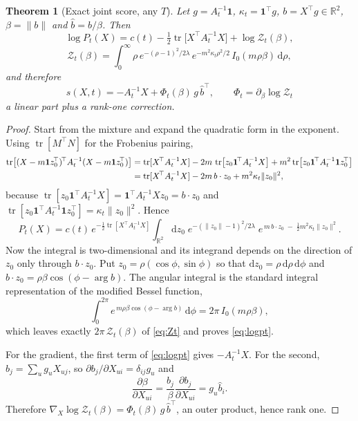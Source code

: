 \documentclass[11pt]{article}
\theoremstyle{plain}
\newtheorem{theorem}{Theorem}
\theoremstyle{remark}
\newcommand{\R}{\mathbb{R}}
\newcommand{\Z}{\mathcal{Z}}
\newcommand{\dd}{\mathrm{d}}
\newcommand{\T}{^{\!\top}}
\newcommand{\one}{\mathbf{1}}
\newcommand{\score}{s}
\DeclareMathOperator{\tr}{tr}
\begin{document}
\begin{theorem}[Exact joint score, any $T$]\label{thm:score}
Let $g = A_t^{-1}\one$, $\kappa_t = \one\T g$, $b = X\T g \in \R^2$,
$\beta = \|b\|$ and $\hat b = b/\beta$. Then
\begin{equation}
  \log P_t(X) = c(t) - \tfrac12 \tr\bigl[X\T A_t^{-1} X\bigr]
  + \log \Z_t(\beta),
  \label{eq:logpt}
\end{equation}
\begin{equation}
  \Z_t(\beta) = \int_0^\infty \rho\, e^{-(\rho-1)^2/2\lambda}\,
  e^{-m^2\kappa_t \rho^2/2}\, I_0(m\rho\beta)\, \dd\rho,
  \label{eq:Zt}
\end{equation}
and therefore
\begin{equation}
  \boxed{\ \score(X,t) = -A_t^{-1} X + \Phi_t(\beta)\, g\, \hat b\T,
  \qquad \Phi_t = \partial_\beta \log \Z_t\ }
  \label{eq:mainscore}
\end{equation}
a linear part plus a \emph{rank-one} correction.
\end{theorem}

\begin{proof}
Start from the mixture and expand the quadratic form in the exponent. Using
$\tr[M\T N]$ for the Frobenius pairing,
\begin{align}
  \tr\bigl[(X - m\one z_0\T)\T A_t^{-1}(X - m\one z_0\T)\bigr]
  &= \tr[X\T A_t^{-1} X]
   - 2m\, \tr\bigl[z_0 \one\T A_t^{-1} X\bigr]
   + m^2 \tr\bigl[z_0 \one\T A_t^{-1}\one z_0\T\bigr] \notag\\
  &= \tr[X\T A_t^{-1} X] - 2m\, b \cdot z_0 + m^2 \kappa_t \|z_0\|^2,
  \label{eq:expand}
\end{align}
because $\tr[z_0\one\T A_t^{-1}X] = \one\T A_t^{-1} X z_0 = b\cdot z_0$ and
$\tr[z_0 \one\T A_t^{-1}\one z_0\T] = \kappa_t \|z_0\|^2$. Hence
\begin{equation}
  P_t(X) = c(t)\, e^{-\frac12 \tr[X\T A_t^{-1}X]}
  \int_{\R^2} \dd z_0\; e^{-(\|z_0\|-1)^2/2\lambda}\;
  e^{\,m\, b\cdot z_0 \;-\; \frac12 m^2 \kappa_t \|z_0\|^2}.
  \label{eq:mixint}
\end{equation}
Now the integral is two-dimensional and its integrand depends on the direction
of $z_0$ only through $b\cdot z_0$. Put $z_0 = \rho(\cos\phi, \sin\phi)$ so that
$\dd z_0 = \rho\,\dd\rho\,\dd\phi$ and
$b \cdot z_0 = \rho\beta\cos(\phi - \arg b)$. The angular integral is the
standard integral representation of the modified Bessel function,
\begin{equation}
  \int_0^{2\pi} e^{\,m\rho\beta\cos(\phi - \arg b)}\, \dd\phi
  = 2\pi\, I_0(m\rho\beta),
\end{equation}
which leaves exactly $2\pi\,\Z_t(\beta)$ of \eqref{eq:Zt} and proves
\eqref{eq:logpt}.

For the gradient, the first term of \eqref{eq:logpt} gives $-A_t^{-1}X$. For the
second, $b_j = \sum_u g_u X_{uj}$, so $\partial b_j/\partial X_{ui} =
\delta_{ij} g_u$ and
\begin{equation}
  \frac{\partial \beta}{\partial X_{ui}}
  = \frac{b_j}{\beta}\frac{\partial b_j}{\partial X_{ui}} = g_u \hat b_i .
\end{equation}
Therefore $\nabla_X \log\Z_t(\beta) = \Phi_t(\beta)\, g\,\hat b\T$, an outer
product, hence rank one.
\end{proof}
\end{document}

